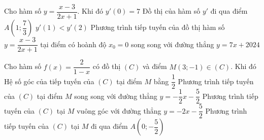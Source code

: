 \begin{ex}%
 Cho  hàm số $y=\dfrac{x-3}{2x+1}$. Khi đó
 \choiceTF 
  {\True $y'(0)=7$} 
  {Đồ thị của hàm số $y'$ đi qua điểm  $A\left(1;\dfrac{7}{3} \right)$}
   {$y'(1)<y'(2)$}
  {\True Phương trình tiếp tuyến của đồ thị hàm số $y=\dfrac{x-3}{2x+1}$ tại điểm có hoành độ $x_0=0$ song song  với đường thẳng $y=7x+2024$}
\end{ex}

\begin{ex}%
 Cho hàm số $f(x)=\dfrac{2}{1-x}$ có đồ thị $\left(C\right)$ và điểm $M(3;-1)\in (C)$. Khi  đó
  \choiceTF
  {\True Hệ số góc của tiếp tuyến của $(C)$ tại điểm $M$  bằng $\dfrac{1}{2}$}
  {Phương  trình tiếp tuyến của $(C)$ tại điểm $M$ song song với đường thẳng $y=-\dfrac{1}{2}x-\dfrac{5}{2}$}
  {\True Phương trình tiếp tuyến của $(C)$ tại $M$ vuông góc  với đường thẳng $y=-2x-\dfrac{5}{2}$}
  {\True Phương trình tiếp tuyến của $(C)$ tại $M$ đi qua  điểm $A\left(0;-\dfrac{5}{2}\right)$}
\end{ex}


